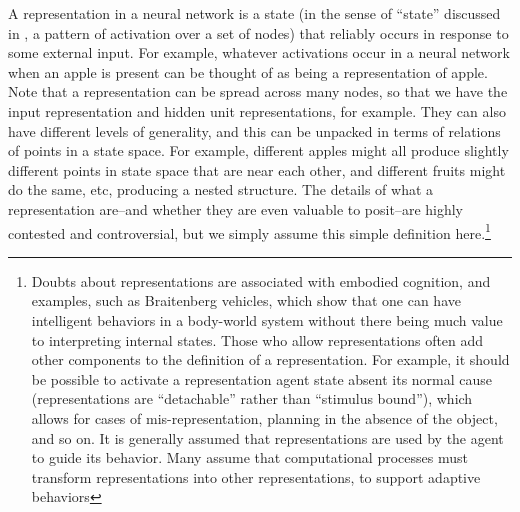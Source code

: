 A representation in a neural network is a state (in the sense of ``state'' discussed in ,  a pattern of activation over a set of nodes) that reliably occurs in response to some external input. For example, whatever activations occur in a neural network when an apple is present can be thought of as being a representation of apple. Note that a representation can be spread across many nodes, so that we have the input representation and hidden unit representations, for example. They can also have different levels of generality, and this can be unpacked in terms of relations of points in a state space. For example, different apples might all produce slightly different points in state space that are near each other, and different fruits might do the same, etc, producing a nested structure. The details of what a representation are--and whether they are even valuable to posit--are highly contested and controversial, but we simply assume this simple definition here.\footnote{Doubts about representations are associated with embodied cognition, and examples, such as Braitenberg vehicles, which show that one can have intelligent behaviors in a body-world system without there being much value to interpreting internal states. Those who allow representations  often add other components to the definition of a representation. For example, it should be  possible to activate a representation agent state absent its normal cause (representations  are ``detachable'' rather than ``stimulus bound''), which allows for cases of  mis-representation, planning in the absence of the object, and so on. It is generally assumed that  representations are used by the agent to guide its behavior. Many assume that computational processes must transform representations  into other representations, to support adaptive behaviors}


